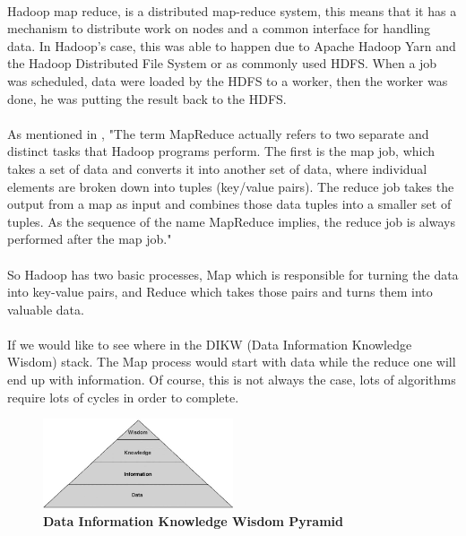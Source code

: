 \paragraph{}Hadoop map reduce, is a distributed map-reduce system, 
this means that it has a mechanism to distribute work on nodes and a common interface for handling data. In Hadoop's case, this was able to happen due to Apache Hadoop Yarn and the Hadoop Distributed File System or as commonly used HDFS. When a job was scheduled, data were loaded by the HDFS to a worker, 
then the worker was done, he was putting the result back to the HDFS. 

\paragraph{}As mentioned in \cite{ibmMapReduce:5}, "The term MapReduce actually refers to two separate and distinct tasks that Hadoop programs perform. The first is the map job, which takes a set of data and converts it into another set of data, where individual elements are broken down into tuples (key/value pairs). The reduce job takes the output from a map as input and combines those data tuples into a smaller set of tuples. As the sequence of the name MapReduce implies, the reduce job is always performed after the map job."

\paragraph{}So Hadoop has two basic processes, Map which is responsible for turning the data into key-value pairs, and Reduce which takes those pairs and turns them into valuable data.

\paragraph{}If we would like to see where in the DIKW (Data Information Knowledge Wisdom) stack. The Map process would start with data while the reduce one will end up with information. Of course, this is not always the case, lots of algorithms require lots of cycles in order to complete. \\

\begin{figure}[h]
	\centering
	\includegraphics[width=0.5\textwidth]{../images/DIKW.png}
	\caption{\bfseries Data Information Knowledge Wisdom Pyramid \cite{TheWisdomHierachy:7}}
	\label{dikw}
\end{figure}
